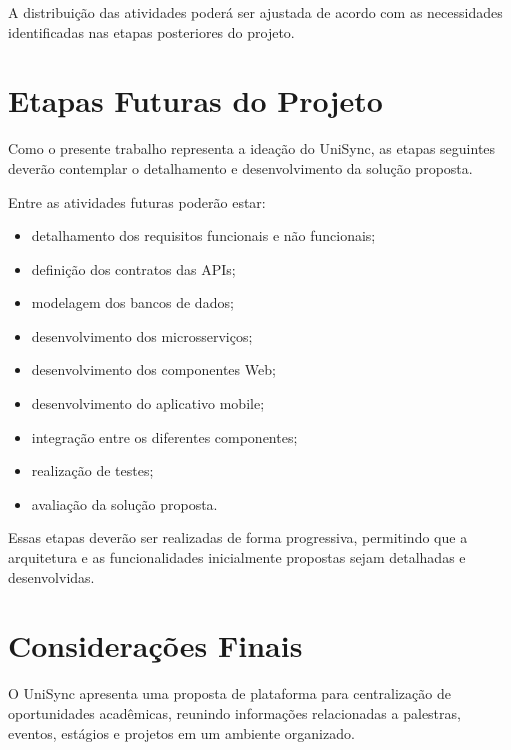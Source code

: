 \documentclass[12pt,oneside,a4paper,chapter=TITLE]{abntex2}
\begin{document}
A distribuição das atividades poderá ser ajustada de acordo com as
necessidades identificadas nas etapas posteriores do projeto.

\chapter{Etapas Futuras do Projeto}

Como o presente trabalho representa a ideação do UniSync, as etapas
seguintes deverão contemplar o detalhamento e desenvolvimento da
solução proposta.

Entre as atividades futuras poderão estar:

\begin{itemize}
    \item detalhamento dos requisitos funcionais e não funcionais;

    \item definição dos contratos das APIs;

    \item modelagem dos bancos de dados;

    \item desenvolvimento dos microsserviços;

    \item desenvolvimento dos componentes Web;

    \item desenvolvimento do aplicativo mobile;

    \item integração entre os diferentes componentes;

    \item realização de testes;

    \item avaliação da solução proposta.
\end{itemize}

Essas etapas deverão ser realizadas de forma progressiva, permitindo
que a arquitetura e as funcionalidades inicialmente propostas sejam
detalhadas e desenvolvidas.

\chapter{Considerações Finais}

O UniSync apresenta uma proposta de plataforma para centralização de
oportunidades acadêmicas, reunindo informações relacionadas a
palestras, eventos, estágios e projetos em um ambiente organizado.
\end{document}
